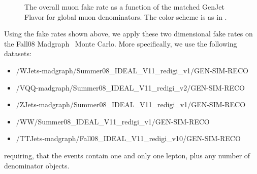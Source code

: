 \documentclass{cmspaper}
\begin{document}
\begin{figure}[htb]
\begin{center}
   \caption{The overall muon fake rate as a function of the matched GenJet Flavor for global muon denominators. The color scheme is as in .}
   \label{fig:GlobalMuonFakeRate_JetFlavor}
\end{center}
\end{figure}

\begin{minipage}{\textwidth}
Using the fake rates shown above, we apply these two dimensional fake rates on the Fall08 Madgraph \WPlusJets\ Monte Carlo. More specifically, we use the following datasets:
\begin{itemize}
\item /WJets-madgraph/Summer08\_IDEAL\_V11\_redigi\_v1/GEN-SIM-RECO 
\item /VQQ-madgraph/Summer08\_IDEAL\_V11\_redigi\_v2/GEN-SIM-RECO 
\item /ZJets-madgraph/Summer08\_IDEAL\_V11\_redigi\_v1/GEN-SIM-RECO
\item /WW/Summer08\_IDEAL\_V11\_redigi\_v1/GEN-SIM-RECO
\item /TTJets-madgraph/Fall08\_IDEAL\_V11\_redigi\_v10/GEN-SIM-RECO
\end{itemize}

requiring, that the events contain one and only one lepton, plus any number of denominator objects.
\end{minipage}
\end{document}
